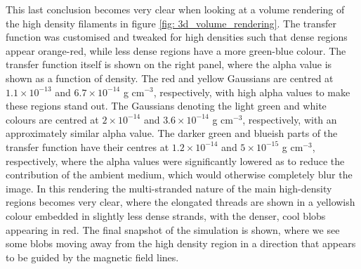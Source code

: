 This last conclusion becomes very clear when looking at a volume rendering of the high density filaments in figure \ref{fig: 3d_volume_rendering}. The transfer function was customised and tweaked for high densities such that dense regions appear orange-red, while less dense regions have a more green-blue colour. The transfer function itself is shown on the right panel, where the alpha value is shown as a function of density. The red and yellow Gaussians are centred at $1.1 \times 10^{-13}$ and $6.7 \times 10^{-14}$ g cm$^{-3}$, respectively, with high alpha values to make these regions stand out. The Gaussians denoting the light green and white colours are centred at $2 \times 10^{-14}$ and $3.6 \times 10^{-14}$ g cm$^{-3}$, respectively, with an approximately similar alpha value. The darker green and blueish parts of the transfer function have their centres at $1.2 \times 10^{-14}$ and $5 \times 10^{-15}$ g cm$^{-3}$, respectively, where the alpha values were significantly lowered as to reduce the contribution of the ambient medium, which would otherwise completely blur the image. In this rendering the multi-stranded nature of the main high-density regions becomes very clear, where the elongated threads are shown in a yellowish colour embedded in slightly less dense strands, with the denser, cool blobs appearing in red. The final snapshot of the simulation is shown, where we see some blobs moving away from the high density region in a direction that appears to be guided by the magnetic field lines.

